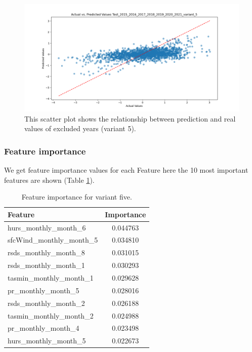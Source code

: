 \documentclass{article}
\begin{document}
\begin{figure}[H]
	\centering
	\includegraphics[width=1.0\textwidth]{./plots/scatter_Test_2015_2016_2017_2018_2019_2020_2021_variant_5.png}
	\caption{\label{fig:scatter_excluded_years_variant_5}This scatter plot shows the relationship between prediction and real values of excluded years (variant 5).}
\end{figure}

\subsubsection{Feature importance}
We get feature importance values for each Feature here the 10 most important features are shown (Table \ref{table:feature_importance_variant_5}).
\begin{table}[H]
	\centering
	\begin{tabular}{lc}
		\hline
		Feature                    & Importance \\
		\hline
		hurs\_monthly\_month\_6    & 0.044763   \\
		sfcWind\_monthly\_month\_5 & 0.034810   \\
		rsds\_monthly\_month\_8    & 0.031015   \\
		rsds\_monthly\_month\_1    & 0.030293   \\
		tasmin\_monthly\_month\_1  & 0.029628   \\
		pr\_monthly\_month\_5      & 0.028016   \\
		rsds\_monthly\_month\_2    & 0.026188   \\
		tasmin\_monthly\_month\_2  & 0.024988   \\
		pr\_monthly\_month\_4      & 0.023498   \\
		hurs\_monthly\_month\_5    & 0.022673   \\
		\hline
	\end{tabular}
	\caption{\label{table:feature_importance_variant_5} Feature importance for variant five.}
\end{table}
\end{document}
